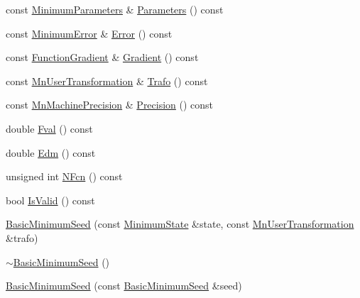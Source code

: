 \begin{DoxyCompactItemize}
const \mbox{\hyperlink{classROOT_1_1Minuit2_1_1MinimumParameters}{Minimum\+Parameters}} \& \mbox{\hyperlink{classROOT_1_1Minuit2_1_1BasicMinimumSeed_a0aec3622cdc4f1c52a4be74f8b96059a}{Parameters}} () const
\item 
const \mbox{\hyperlink{classROOT_1_1Minuit2_1_1MinimumError}{Minimum\+Error}} \& \mbox{\hyperlink{classROOT_1_1Minuit2_1_1BasicMinimumSeed_a108de61cfe9f1766c3d7e251202a29df}{Error}} () const
\item 
const \mbox{\hyperlink{classROOT_1_1Minuit2_1_1FunctionGradient}{Function\+Gradient}} \& \mbox{\hyperlink{classROOT_1_1Minuit2_1_1BasicMinimumSeed_ab61377b63a177c93629ccb3e69e173db}{Gradient}} () const
\item 
const \mbox{\hyperlink{classROOT_1_1Minuit2_1_1MnUserTransformation}{Mn\+User\+Transformation}} \& \mbox{\hyperlink{classROOT_1_1Minuit2_1_1BasicMinimumSeed_aa40157cea0a8a75b56af25bbc64f8d39}{Trafo}} () const
\item 
const \mbox{\hyperlink{classROOT_1_1Minuit2_1_1MnMachinePrecision}{Mn\+Machine\+Precision}} \& \mbox{\hyperlink{classROOT_1_1Minuit2_1_1BasicMinimumSeed_af06c66e8851f7314915e01e0bedb200c}{Precision}} () const
\item 
double \mbox{\hyperlink{classROOT_1_1Minuit2_1_1BasicMinimumSeed_a40b43b611717121256cd72bf40a3d5d7}{Fval}} () const
\item 
double \mbox{\hyperlink{classROOT_1_1Minuit2_1_1BasicMinimumSeed_a10659878d070bed73df23682eab3e88e}{Edm}} () const
\item 
unsigned int \mbox{\hyperlink{classROOT_1_1Minuit2_1_1BasicMinimumSeed_a1d34718bf163936432ef05dea799c469}{N\+Fcn}} () const
\item 
bool \mbox{\hyperlink{classROOT_1_1Minuit2_1_1BasicMinimumSeed_ab53f2619d2b6be3d3d9303f8de29ab28}{Is\+Valid}} () const
\item 
\mbox{\hyperlink{classROOT_1_1Minuit2_1_1BasicMinimumSeed_aae0d1c36a05bf57a221d1930a9ffbb87}{Basic\+Minimum\+Seed}} (const \mbox{\hyperlink{classROOT_1_1Minuit2_1_1MinimumState}{Minimum\+State}} \&state, const \mbox{\hyperlink{classROOT_1_1Minuit2_1_1MnUserTransformation}{Mn\+User\+Transformation}} \&trafo)
\item 
\mbox{\hyperlink{classROOT_1_1Minuit2_1_1BasicMinimumSeed_ab0106865fff141f6f402cc934ea292d7}{$\sim$\+Basic\+Minimum\+Seed}} ()
\item 
\mbox{\hyperlink{classROOT_1_1Minuit2_1_1BasicMinimumSeed_a9bd68bcfd30880f67566bfd4f70a2ca6}{Basic\+Minimum\+Seed}} (const \mbox{\hyperlink{classROOT_1_1Minuit2_1_1BasicMinimumSeed}{Basic\+Minimum\+Seed}} \&seed)

\end{DoxyCompactItemize}
